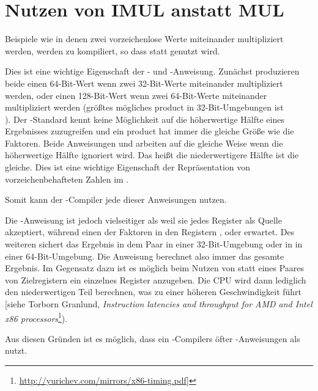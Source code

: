 \section{Nutzen von IMUL anstatt MUL}
\label{IMUL_over_MUL}

Beispiele wie  in denen zwei vorzeichenlose Werte miteinander multipliziert
werden, werden zu  kompiliert, so dass \IMUL statt \MUL genutzt wird.

Dies ist eine wichtige Eigenschaft der \MUL- und \IMUL-Anweisung.
Zunächst produzieren beide einen 64-Bit-Wert wenn zwei 32-Bit-Werte miteinander multipliziert werden,
oder einen 128-Bit-Wert wenn zwei 64-Bit-Werte miteinander multipliziert werden (größtes mögliches \gls{product}
in 32-Bit-Umgebungen ist \\
).
Der \CCpp-Standard kennt keine Möglichkeit auf die höherwertige Hälfte eines Ergebnisses zuzugreifen
und ein \gls{product} hat immer die gleiche Größe wie die Faktoren. %
Beide Anweisungen \MUL und \IMUL arbeiten auf die gleiche Weise wenn die höherwertige Hälfte ignoriert wird.
Das heißt die niederwertigere Hälfte ist die gleiche.
Dies ist eine wichtige Eigenschaft der Repräsentation von vorzeichenbehafteten Zahlen im .

Somit kann der \CCpp-Compiler jede dieser Anweisungen nutzen.

Die \IMUL-Anweisung ist jedoch vielseitiger als \MUL weil sie jedes Register als Quelle akzeptiert,
während \MUL einen der Faktoren in den Registern \AX, \EAX oder \RAX erwartet.
Des weiteren sichert \MUL das Ergebnis in dem  Paar in einer 32-Bit-Umgebung oder
in  in einer 64-Bit-Umgebung. Die Anweisung berechnet also immer das gesamte Ergebnis.
Im Gegensatz dazu ist es möglich beim Nutzen von \IMUL statt eines Paares von Zielregistern ein
einzelnes Register anzugeben. Die \ac{CPU} wird dann lediglich den niederwertigen Teil berechnen,
was zu einer höheren Geschwindigkeit führt [siehe Torborn Granlund, \emph{Instruction latencies and throughput for AMD and Intel x86 processors}\footnote{\url{http://yurichev.com/mirrors/x86-timing.pdf}]}).

Aus diesen Gründen ist es möglich, dass ein \CCpp-Compilers öfter \IMUL-Anweisungen als \MUL nutzt.

